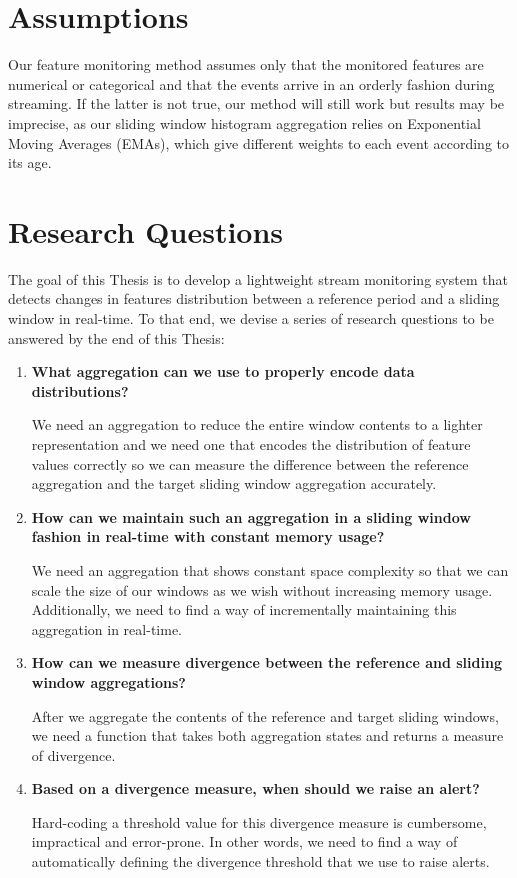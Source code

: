 \section{Assumptions} \label{sec:assumptions}
Our feature monitoring method assumes only that the monitored features are numerical or categorical and that the events arrive in an orderly fashion during streaming. If the latter is not true, our method will still work but results may be imprecise, as our sliding window histogram aggregation relies on Exponential Moving Averages (EMAs), which give different weights to each event according to its age.

\section{Research Questions} \label{sec:rqs}
The goal of this Thesis is to develop a lightweight stream monitoring system that detects changes in features distribution between a reference period and a sliding window in real-time. To that end, we devise a series of research questions to be answered by the end of this Thesis:

\begin{enumerate}[leftmargin=1.6cm, label=\textbf{(RQ\arabic*)}]
    \item \textbf{What aggregation can we use to properly encode data distributions?}
    
    We need an aggregation to reduce the entire window contents to a lighter representation and we need one that encodes the distribution of feature values correctly so we can measure the difference between the reference aggregation and the target sliding window aggregation accurately.
    
    \item \textbf{How can we maintain such an aggregation in a sliding window fashion in real-time with constant memory usage?}
    
    We need an aggregation that shows constant space complexity so that we can scale the size of our windows as we wish without increasing memory usage. Additionally, we need to find a way of incrementally maintaining this aggregation in real-time.
    
    
    \item \textbf{How can we measure divergence between the reference and sliding window aggregations?}
    
    After we aggregate the contents of the reference and target sliding windows, we need a function that takes both aggregation states and returns a measure of divergence.
    
    \item \textbf{Based on a divergence measure, when should we raise an alert?}
    
    Hard-coding a threshold value for this divergence measure is cumbersome, impractical and error-prone. In other words, we need to find a way of automatically defining the divergence threshold that we use to raise alerts. 
    
\end{enumerate}


